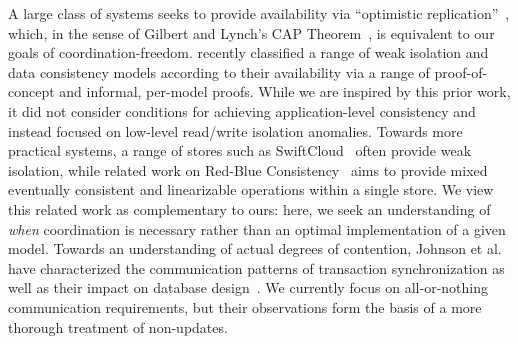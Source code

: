  A large class of systems
seeks to provide availability via ``optimistic
replication''~\cite{optimistic}, which, in the sense of Gilbert and
Lynch's CAP Theorem~\cite{gilbert-cap}, is equivalent to our goals of
coordination-freedom. \cite{hat-vldb} recently classified a range of
weak isolation and data consistency models according to their
availability via a range of proof-of-concept and informal, per-model
proofs. While we are inspired by this prior work, it did not consider
conditions for achieving application-level consistency and instead
focused on low-level read/write isolation anomalies. Towards more
practical systems, a range of stores such as SwiftCloud~\cite{swift}
often provide weak isolation, while related work on Red-Blue
Consistency~\cite{redblue} aims to provide mixed eventually consistent
and linearizable operations within a single store. We view this
related work as complementary to ours: here, we seek an understanding
of \textit{when} coordination is necessary rather than an optimal
implementation of a given model. Towards an understanding of actual
degrees of contention, Johnson et al. have characterized the
communication patterns of transaction synchronization as well as their
impact on database design~\cite{shore-communication}. We currently
focus on all-or-nothing communication requirements, but their
observations form the basis of a more thorough treatment of
non-\iconfluent updates.

